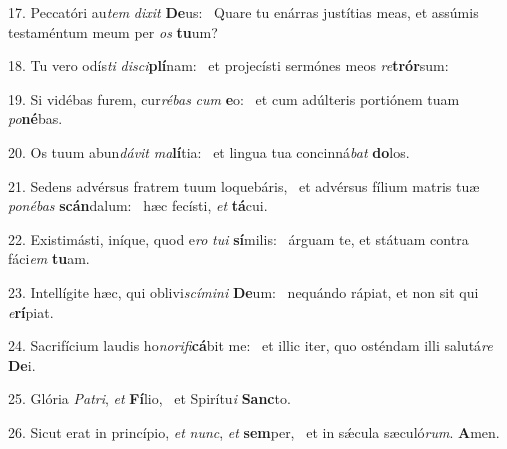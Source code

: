17. Peccatóri au\textit{tem} \textit{di}\textit{xit} \textbf{De}us: \ast\  Quare tu enárras justítias meas, et assúmis testaméntum meum per \textit{os} \textbf{tu}um?\

18. Tu vero odís\textit{ti} \textit{di}\textit{sci}\textbf{plí}nam: \ast\  et projecísti sermónes meos \textit{re}\textbf{trór}sum:\

19. Si vidébas furem, cur\textit{ré}\textit{bas} \textit{cum} \textbf{e}o: \ast\  et cum adúlteris portiónem tuam \textit{po}\textbf{né}bas.\

20. Os tuum abun\textit{dá}\textit{vit} \textit{ma}\textbf{lí}tia: \ast\  et lingua tua concinná\textit{bat} \textbf{do}los.\

21. Sedens advérsus fratrem tuum loquebáris, \dag\  et advérsus fílium matris tuæ \textit{po}\textit{né}\textit{bas} \textbf{scán}dalum: \ast\  hæc fecísti, \textit{et} \textbf{tá}cui.\

22. Existimásti, iníque, quod e\textit{ro} \textit{tu}\textit{i} \textbf{sí}milis: \ast\  árguam te, et státuam contra fáci\textit{em} \textbf{tu}am.\

23. Intellígite hæc, qui oblivi\textit{scí}\textit{mi}\textit{ni} \textbf{De}um: \ast\  nequándo rápiat, et non sit qui \textit{e}\textbf{rí}piat.\

24. Sacrifícium laudis ho\textit{no}\textit{ri}\textit{fi}\textbf{cá}bit me: \ast\  et illic iter, quo osténdam illi salutá\textit{re} \textbf{De}i.\

25. Glória \textit{Pa}\textit{tri}, \textit{et} \textbf{Fí}lio, \ast\  et Spirítu\textit{i} \textbf{Sanc}to.\

26. Sicut erat in princípio, \textit{et} \textit{nunc}, \textit{et} \textbf{sem}per, \ast\  et in sǽcula sæculó\textit{rum}. \textbf{A}men.\

